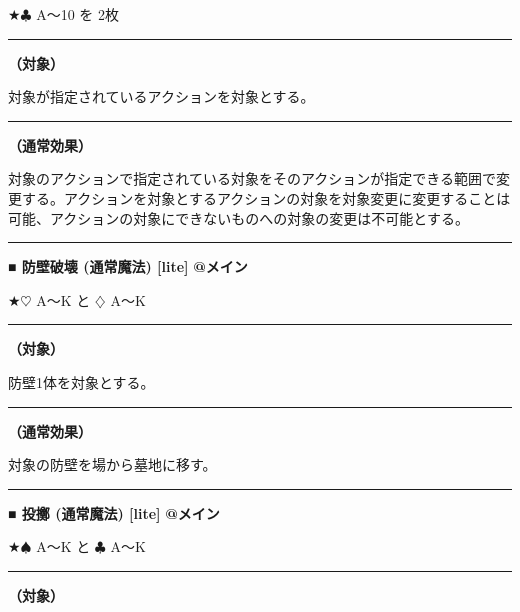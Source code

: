 \documentclass[twocolumn,a5paper,papersize,10pt]{jarticle}
\begin{document}
★{\normalsize $\clubsuit$} A〜10 を 2枚

\vspace{1mm}%
\hrule height 0.1mm depth 0mm width 66.5mm %
\vspace{1mm}%
{\bf（対象）}

対象が指定されているアクションを対象とする。
\vspace{1mm}%
\hrule height 0.1mm depth 0mm width 66.5mm %
\vspace{1mm}%

{\bf（通常効果）}

対象のアクションで指定されている対象をそのアクションが指定できる範囲で変更する。アクションを対象とするアクションの対象を対象変更に変更することは可能、アクションの対象にできないものへの対象の変更は不可能とする。
\vspace{2mm} %
\hrule height 0.5mm depth 0mm width 66.5mm %
\vspace{1mm} %
{\normalsize\bf ■ 防壁破壊 {\scriptsize (通常魔法) [lite]}} %
\hfill 
{\small\bf @メイン }

★{\normalsize $\heartsuit$} A〜K と {\normalsize $\diamondsuit$} A〜K

\vspace{1mm}%
\hrule height 0.1mm depth 0mm width 66.5mm %
\vspace{1mm}%
{\bf（対象）}

防壁1体を対象とする。
\vspace{1mm}%
\hrule height 0.1mm depth 0mm width 66.5mm %
\vspace{1mm}%

{\bf（通常効果）}

対象の防壁を場から墓地に移す。
\vspace{2mm} %
\hrule height 0.5mm depth 0mm width 66.5mm %
\vspace{1mm} %
{\normalsize\bf ■ 投擲 {\scriptsize (通常魔法) [lite]}} %
\hfill 
{\small\bf @メイン }

★{\normalsize $\spadesuit$} A〜K と {\normalsize $\clubsuit$} A〜K

\vspace{1mm}%
\hrule height 0.1mm depth 0mm width 66.5mm %
\vspace{1mm}%
{\bf（対象）}
\end{document}
